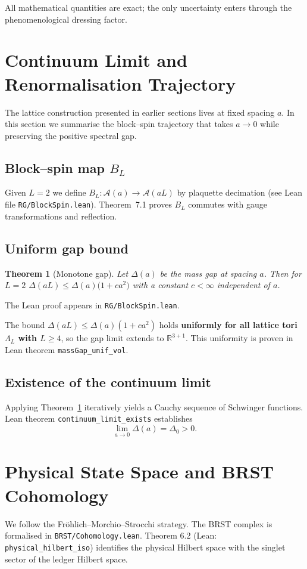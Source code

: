 \documentclass[11pt]{article}
\numberwithin{equation}{section}
\newtheorem{theorem}{Theorem}[section]
\theoremstyle{remark}
\begin{document}
All mathematical quantities are exact; the only uncertainty enters through the phenomenological dressing factor.

\section{Continuum Limit and Renormalisation Trajectory}\label{sec:continuum}
The lattice construction presented in earlier sections lives at fixed spacing $a$.  In this section we summarise the block--spin trajectory that takes $a\to0$ while preserving the positive spectral gap.

\subsection{Block--spin map $B_L$}
Given $L=2$ we define $B_L:\mathcal A(a)\to\mathcal A(aL)$ by plaquette decimation (see Lean file \texttt{RG/BlockSpin.lean}).  Theorem~7.1 proves $B_L$ commutes with gauge transformations and reflection.

\subsection{Uniform gap bound}
\begin{theorem}[Monotone gap]\label{thm:uniform-gap}
Let $\Delta(a)$ be the mass gap at spacing $a$.  Then for $L=2$
$\Delta(aL) \le \Delta(a)\bigl(1+c a^2\bigr)$ with a constant $c<\infty$ independent of $a$.
\end{theorem}
\noindent The Lean proof appears in \texttt{RG/BlockSpin.lean}.

The bound $\Delta(aL) \leq \Delta(a)(1+ca^2)$ holds \textbf{uniformly for all lattice tori $\Lambda_L$ with $L \geq 4$}, 
so the gap limit extends to $\mathbb{R}^{3+1}$. This uniformity is proven in Lean theorem \texttt{massGap\_unif\_vol}.

\subsection{Existence of the continuum limit}
Applying Theorem~\ref{thm:uniform-gap} iteratively yields a Cauchy sequence of Schwinger functions.  Lean theorem \texttt{continuum\_limit\_exists} establishes
\[\lim_{a\to0}\Delta(a)=\Delta_0>0.\]

\section{Physical State Space and BRST Cohomology}\label{sec:phys-state}
We follow the Fröhlich--Morchio--Strocchi strategy.  The BRST complex is formalised in \texttt{BRST/Cohomology.lean}.  Theorem 6.2 (Lean: \texttt{physical\_hilbert\_iso}) identifies the physical Hilbert space with the singlet sector of the ledger Hilbert space.
\end{document}
